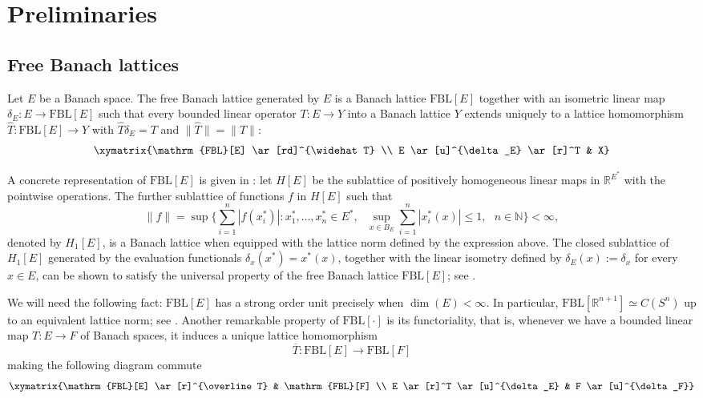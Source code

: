 \documentclass[12pt]{amsart}
\newcommand{\FBL}{\mathrm{FBL}}
\theoremstyle{plain}
\theoremstyle{definition}
\begin{document}
%


\section{Preliminaries}\label{sec:preliminaries}
\subsection{Free Banach lattices} Let $E$ be a Banach space. The free Banach lattice generated by $E$ is a Banach lattice $\FBL[E]$ together with an isometric linear map $\delta_E:E \to \FBL[E]$ such that every bounded linear operator $T:E \to Y$ into a Banach lattice $Y$ extends uniquely to a lattice homomorphism $\widehat{T}:\FBL[E] \to Y$ with $\widehat{T}\delta_E=T$ and $\|\widehat{T}\|=\|T\|$: 
\[
\xymatrix{\FBL[E] \ar[rd]^{\widehat T} \\ E \ar[u]^{\delta_E} \ar[r]^T & X}
\]

A concrete representation of $\FBL[E]$ is given in \cite{freebasico}: let $H[E]$ be the sublattice of positively homogeneous linear maps in $\mathbb{R}^{E^*}$ with the pointwise operations. The further sublattice of functions $f$ in $H[E]$ such that
\[
\|f\|=\sup\Big\{\sum_{i=1}^n|f(x_i^*)|:x_1^*,\ldots,x_n^*\in E^*,\text{ }\sup_{x\in B_E}\sum_{i=1}^n|x^*_i(x)|\leq 1,\text{ }n\in\mathbb{N}\Big\}<\infty,
\]
denoted by $H_1[E]$, is a Banach lattice when equipped with the lattice norm defined by the expression above. The closed sublattice of $H_1[E]$ generated by the evaluation functionals $\delta_x(x^*)=x^*(x)$, together with the linear isometry defined by $\delta_E(x):=\delta_x$ for every $x\in E$, can be shown to satisfy the universal property of the free Banach lattice $\FBL[E]$; see \cite[Theorem 2.4]{freebasico}.

We will need the following fact: $\FBL[E]$ has a strong order unit precisely when $\dim(E)<\infty$. In particular, $\FBL[\mathbb{R}^{n+1}]\simeq C(S^n)$ up to an equivalent lattice norm; see \cite[Proposition 9.1]{freebanlat}. Another remarkable property of $\FBL[\cdot]$ is its functoriality, that is, whenever we have a bounded linear map $T:E\to F$ of Banach spaces, it induces a unique lattice homomorphism \[
\overline T:\FBL[E]\to \FBL[F]
\]
making the following diagram commute
\[
\xymatrix{\FBL[E] \ar[r]^{\overline T} & \FBL[F] \\ E \ar[r]^T \ar[u]^{\delta_E} & F \ar[u]^{\delta_F}}
\]
\end{document}
